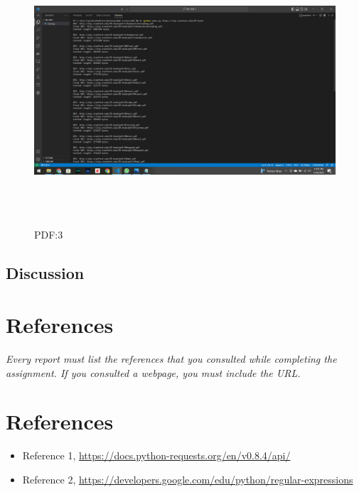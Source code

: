 \documentclass[12pt]{article}
\begin{document}
\begin{figure}[h!]
    \centering
    \includegraphics[trim=0 0 0 0, clip, width=\textwidth,height=10cm] {Q3c.png}
    \caption{PDF:3}
    \label{fig:Q3c}
\end{figure}



\subsection*{Discussion}

\section*{References}

\emph{Every report must list the references that you consulted while completing the assignment. If you consulted a webpage, you must include the URL.}
\section*{References}

\begin{itemize}
    \item {Reference 1, \url{https://docs.python-requests.org/en/v0.8.4/api/}}
    \item {Reference 2, \url{https://developers.google.com/edu/python/regular-expressions}}
\end{itemize}
\end{document}
